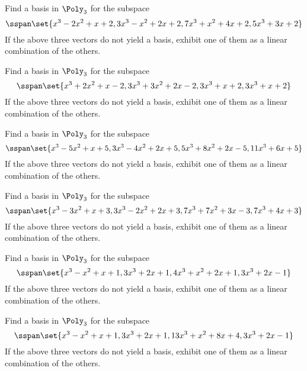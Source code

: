 \begin{ex}
  Find a basis in $\Poly_{3}$ for the subspace
  \begin{equation*}
    \sspan\set{
      x^{3}-2x^{2}+x+2,3x^{3}-x^{2}+2x+2,7x^{3}+x^{2}+4x+2,5x^{3}+3x+2}
  \end{equation*}
  If the above three vectors do not yield a basis, exhibit one of them as a
  linear combination of the others.
\end{ex}

\begin{ex}
  Find a basis in $\Poly_{3}$ for the subspace
  \begin{equation*}
    \sspan\set{
      x^{3}+2x^{2}+x-2,3x^{3}+3x^{2}+2x-2,3x^{3}+x+2,3x^{3}+x+2}
  \end{equation*}
  If the above three vectors do not yield a basis, exhibit one of them as a
  linear combination of the others.
\end{ex}

\begin{ex}
  Find a basis in $\Poly_{3}$ for the subspace
  \begin{equation*}
    \sspan\set{
      x^{3}-5x^{2}+x+5,3x^{3}-4x^{2}+2x+5,5x^{3}+8x^{2}+2x-5,11x^{3}+6x+5}
  \end{equation*}
  If the above three vectors do not yield a basis, exhibit one of them as a
  linear combination of the others.
\end{ex}

\begin{ex}
  Find a basis in $\Poly_{3}$ for the subspace
  \begin{equation*}
    \sspan\set{
      x^{3}-3x^{2}+x+3,3x^{3}-2x^{2}+2x+3,7x^{3}+7x^{2}+3x-3,7x^{3}+4x+3}
  \end{equation*}
  If the above three vectors do not yield a basis, exhibit one
  of them as a linear combination of the others.
\end{ex}

\begin{ex}
  Find a basis in $\Poly_{3}$ for the subspace
  \begin{equation*}
    \sspan\set{
      x^{3}-x^{2}+x+1,3x^{3}+2x+1,4x^{3}+x^{2}+2x+1,3x^{3}+2x-1}
  \end{equation*}
  If the above three vectors do not yield a basis, exhibit one
  of them as a linear combination of the others.
\end{ex}

\begin{ex}
  Find a basis in $\Poly_{3}$ for the subspace
  \begin{equation*}
    \sspan\set{
      x^{3}-x^{2}+x+1,3x^{3}+2x+1,13x^{3}+x^{2}+8x+4,3x^{3}+2x-1}
  \end{equation*}
  If the above three vectors do not yield a basis, exhibit one
  of them as a linear combination of the others.
\end{ex}

